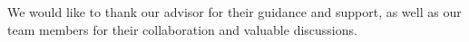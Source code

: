 We would like to thank our advisor for their guidance and support, as well as our team members for their collaboration and valuable discussions.